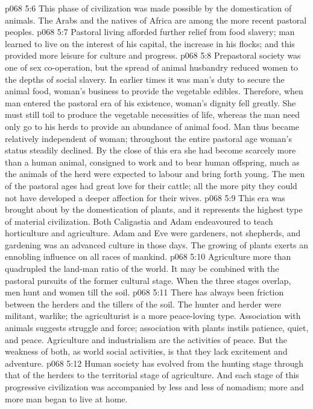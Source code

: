 \vs p068 5:6 \bibnobreakspace {} This phase of civilization was made possible by the domestication of animals. The Arabs and the natives of Africa are among the more recent pastoral peoples.
\vs p068 5:7 Pastoral living afforded further relief from food slavery; man learned to live on the interest of his capital, the increase in his flocks; and this provided more leisure for culture and progress.
\vs p068 5:8 Prepastoral society was one of sex co\hyp{}operation, but the spread of animal husbandry reduced women to the depths of social slavery. In earlier times it was man’s duty to secure the animal food, woman’s business to provide the vegetable edibles. Therefore, when man entered the pastoral era of his existence, woman’s dignity fell greatly. She must still toil to produce the vegetable necessities of life, whereas the man need only go to his herds to provide an abundance of animal food. Man thus became relatively independent of woman; throughout the entire pastoral age woman’s status steadily declined. By the close of this era she had become scarcely more than a human animal, consigned to work and to bear human offspring, much as the animals of the herd were expected to labour and bring forth young. The men of the pastoral ages had great love for their cattle; all the more pity they could not have developed a deeper affection for their wives.
\vs p068 5:9 \bibnobreakspace {} This era was brought about by the domestication of plants, and it represents the highest type of material civilization. Both Caligastia and Adam endeavoured to teach horticulture and agriculture. Adam and Eve were gardeners, not shepherds, and gardening was an advanced culture in those days. The growing of plants exerts an ennobling influence on all races of mankind.
\vs p068 5:10 Agriculture more than quadrupled the land\hyp{}man ratio of the world. It may be combined with the pastoral pursuits of the former cultural stage. When the three stages overlap, men hunt and women till the soil.
\vs p068 5:11 There has always been friction between the herders and the tillers of the soil. The hunter and herder were militant, warlike; the agriculturist is a more peace\hyp{}loving type. Association with animals suggests struggle and force; association with plants instils patience, quiet, and peace. Agriculture and industrialism are the activities of peace. But the weakness of both, as world social activities, is that they lack excitement and adventure.
\vs p068 5:12 \pc Human society has evolved from the hunting stage through that of the herders to the territorial stage of agriculture. And each stage of this progressive civilization was accompanied by less and less of nomadism; more and more man began to live at home.
